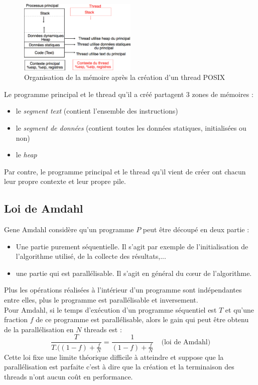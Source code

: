 \begin{figure}
  \vspace{-0.5cm}
  \includegraphics[width=0.5\textwidth]{memthread}
  \caption{\label{fig:memthread}Organisation de la mémoire après la création d'un thread POSIX}
  \vspace{-0.7cm}
\end{figure}
Le programme principal et le thread qu'il a créé partagent 3 zones de mémoires :
\begin{itemize}
  \item le \emph{segment text} (contient l'ensemble des instructions)
  \item le \emph{segment de données} (contient toutes les données statiques, initialisées ou non)
  \item le \emph{heap}
\end{itemize}
Par contre, le programme principal et le thread qu'il vient de créer ont chacun leur propre contexte et leur propre pile.

\subsection{Loi de Amdahl}
Gene Amdahl considère qu'un programme $P$ peut être découpé en deux partie :
\begin{itemize}
  \item Une partie purement séquentielle.
    Il s'agit par exemple de l'initialisation de l'algorithme utilisé, de la collecte des résultats,...
  \item une partie qui est parallélisable.
    Il s'agit en général du cœur de l'algorithme.
\end{itemize}
Plus les opérations réalisées à l'intérieur d'un programme sont indépendantes entre elles, plus le programme est parallélisable et inversement.\\
Pour Amdahl, si le temps d'exécution d'un programme séquentiel est $T$ et qu'une fraction $f$ de ce programme est parallélisable, alors le gain qui peut être obtenu de la parallélisation en $N$ threads est :
$$\frac{T}{T.((1-f) + \frac{f}{N}} = \frac{1}{(1-f) + \frac{f}{N}} ~~~~~ \text{(loi de Amdahl)}$$
Cette loi fixe une limite théorique difficile à atteindre et suppose que la parallélisation est parfaite c'est à dire que la création et la terminaison des threads n'ont aucun coût en performance.
